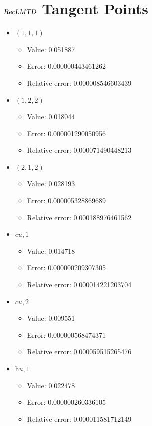 \documentclass{article}%
\begin{document}
\section{$\textsl{RecLMTD}$ Tangent Points}%
\thispagestyle{plain}%
\begin{itemize}%
	\item $(1, 1, 1)$%
	\begin{itemize}%
		\item Value: 0.051887%
		\item Error: 0.000000443461262%
		\item Relative error: 0.000008546603439%
	\end{itemize}%
	\item $(1, 2, 2)$%
	\begin{itemize}%
		\item Value: 0.018044%
		\item Error: 0.000001290050956%
		\item Relative error: 0.000071490448213%
	\end{itemize}%
	\item $(2, 1, 2)$%
	\begin{itemize}%
		\item Value: 0.028193%
		\item Error: 0.000005328869689%
		\item Relative error: 0.000188976461562%
	\end{itemize}%
	\item $\textit{cu},1$%
	\begin{itemize}%
		\item Value: 0.014718%
		\item Error: 0.000000209307305%
		\item Relative error: 0.000014221203704%
	\end{itemize}%
	\item $\textit{cu},2$%
	\begin{itemize}%
		\item Value: 0.009551%
		\item Error: 0.000000568474371%
		\item Relative error: 0.000059515265476%
	\end{itemize}%
	\item $\textit{hu},1$%
	\begin{itemize}%
		\item Value: 0.022478%
		\item Error: 0.000000260336105%
		\item Relative error: 0.000011581712149%
	\end{itemize}%
\end{itemize}%
\end{document}
